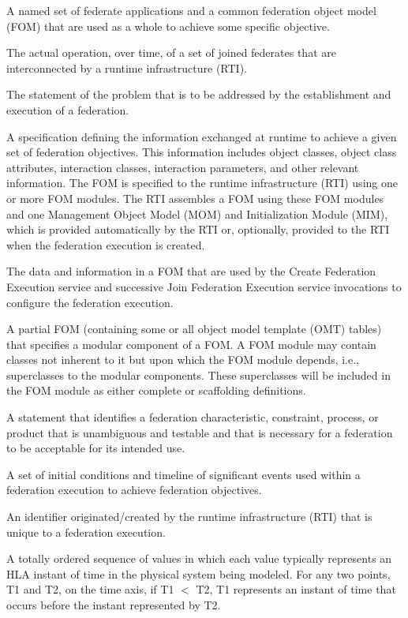  A named set of federate applications and a common federation object model (FOM) that are used as a whole to achieve some specific objective.

 The actual operation, over time, of a set of joined federates that are interconnected by a runtime infrastructure (RTI).

 The statement of the problem that is to be addressed by the establishment and execution of a federation.

 A specification defining the information exchanged at runtime to achieve a given set of federation objectives. This information includes object classes, object class attributes, interaction classes, interaction parameters, and other relevant information. The FOM is specified to the runtime infrastructure (RTI) using one or more FOM modules. The RTI assembles a FOM using these FOM modules and one Management Object Model (MOM) and Initialization Module (MIM), which is provided automatically by the RTI or, optionally, provided to the RTI when the federation execution is created.

 The data and information in a FOM that are used by the Create Federation Execution service and successive Join Federation Execution service invocations to configure the federation execution.

 A partial FOM (containing some or all object model template (OMT) tables) that specifies a modular component of a FOM. A FOM module may contain classes not inherent to it but upon which the FOM module depends, i.e., superclasses to the modular components. These superclasses will be included in the FOM module as either complete or scaffolding definitions.

 A statement that identifies a federation characteristic, constraint, process, or product that is unambiguous and testable and that is necessary for a federation to be acceptable for its intended use.

 A set of initial conditions and timeline of significant events used within a federation execution to achieve federation objectives.

 An identifier originated/created by the runtime infrastructure (RTI) that is unique to a federation execution.

\clearpage
{} A totally ordered sequence of values in which each value typically represents an HLA instant of time in the physical system being modeled. For any two points, T1 and T2, on the time axis, if T1 $<$ T2, T1 represents an instant of time that occurs before the instant represented by T2.

